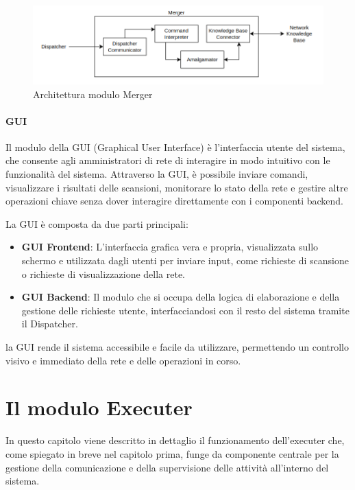 \documentclass[target=bach,aauheader=,style=]{thud}
\begin{document}
\begin{figure}[t]
  \includegraphics[width=\columnwidth]{merger}
  \centering
  \caption{Architettura modulo Merger}
  \label{merger}
\end{figure}

\FloatBarrier


\subsubsection{GUI} 
Il modulo della GUI (Graphical User Interface) è l'interfaccia utente del sistema, che consente agli amministratori di rete di interagire in modo intuitivo con le funzionalità del sistema. Attraverso la GUI, è possibile inviare comandi, visualizzare i risultati delle scansioni, monitorare lo stato della rete e gestire altre operazioni chiave senza dover interagire direttamente con i componenti backend.

La GUI è composta da due parti principali:

\begin{itemize}
  \item \textbf{GUI Frontend}: L'interfaccia grafica vera e propria, visualizzata sullo schermo e utilizzata dagli utenti per inviare input, come richieste di scansione o richieste di visualizzazione della rete.
  \item \textbf{GUI Backend}: Il modulo che si occupa della logica di elaborazione e della gestione delle richieste utente, interfacciandosi con il resto del sistema tramite il Dispatcher.
\end{itemize}

la GUI rende il sistema accessibile e facile da utilizzare, permettendo un controllo visivo e immediato della rete e delle operazioni in corso.

\FloatBarrier

\chapter{Il modulo Executer}
In questo capitolo viene descritto in dettaglio il funzionamento dell'executer che, come spiegato in breve nel capitolo prima, funge da componente centrale per la gestione della comunicazione e della supervisione delle attività all'interno del sistema.
\end{document}
